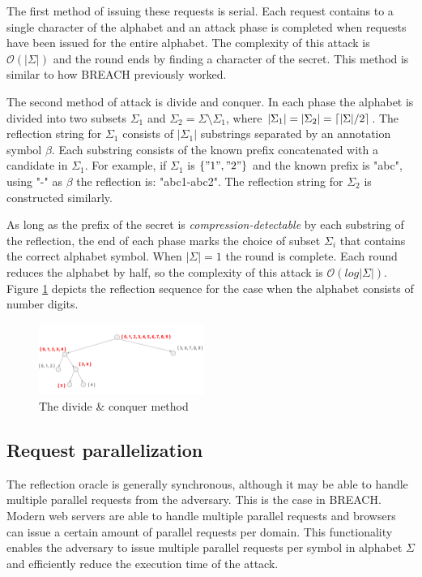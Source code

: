 The first method of issuing these requests is serial. Each request contains to a
single character of the alphabet and an attack phase is completed when requests
have been issued for the entire alphabet. The complexity of this attack is
$\mathcal{O}(|\Sigma|)$ and the round ends by finding a character of the secret.
This method is similar to how BREACH previously worked.

The second method of attack is divide and conquer. In each phase the alphabet is
divided into two subsets $\Sigma_1$ and $\Sigma_2 = \Sigma \setminus \Sigma_1$,
where $|\Sigma_1| = |\Sigma_2| = \lceil|\Sigma| / 2\rceil$. The reflection string for
$\Sigma_1$ consists of $|\Sigma_1|$ substrings separated by an annotation symbol
$\beta$.  Each substring consists of the known prefix concatenated with a
candidate in $\Sigma_1$.  For example, if $\Sigma_1$ is $\{"1", "2"\}$ and the
known prefix is "abc", using "-" as $\beta$ the reflection is: "abc1-abc2". The
reflection string for $\Sigma_2$ is constructed similarly.

As long as the prefix of the secret is \textit{compression-detectable} by each
substring of the reflection, the end of each phase marks the choice of subset
$\Sigma_i$ that contains the correct alphabet symbol.  When $|\Sigma| = 1$ the
round is complete. Each round reduces the alphabet by half, so the complexity of
this attack is $\mathcal{O}(log|\Sigma|)$. Figure \ref{fig:divide_and_conquer}
depicts the reflection sequence for the case when the alphabet consists of
number digits.

   \begin{figure}[thpb]
      \centering
          \includegraphics[width=0.48\textwidth]{figures/divide_and_conquer.png}
      \caption{The divide \& conquer method}
      \label{fig:divide_and_conquer}
   \end{figure}

\subsection{Request parallelization}\label{subsec:parallel}
The reflection oracle is generally synchronous, although it may be able to
handle multiple parallel requests from the adversary.  This is the case in
BREACH.  Modern web servers are able to handle multiple parallel requests and
browsers can issue a certain amount of parallel requests per domain. This
functionality enables the adversary to issue multiple parallel requests per
symbol in alphabet $\Sigma$ and efficiently reduce the execution time of the
attack.

